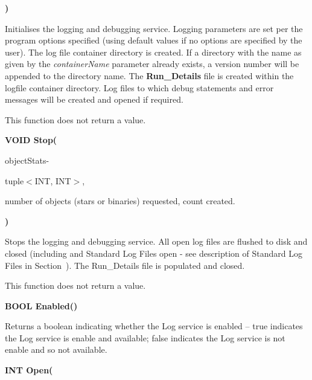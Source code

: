 \textbf{)}

\medskip
Initialises the logging and debugging service. Logging parameters are set per the program options specified (using default values if no options are specified by the user). The log file container directory is created. If a directory with the name as given by the \textit{containerName} parameter already exists, a version number will be appended to the directory name. The \textbf{Run\_Details} file is created within the logfile container directory. Log files to which debug statements and error messages will be created and opened if required.

This function does not return a value.

\newpage
\textbf{VOID Stop(}

\hfill
\begin{minipage}{\dimexpr\textwidth-2em}
    \medskip
    \begin{minipage}[t][][b]{9.5em}objectStats\hfill{-}\end{minipage}
        \begin{minipage}[t][][b]{7.5em}tuple$<$INT, INT$>$,\hfill\end{minipage}
    \begin{minipage}[t][][b]{\dimexpr\textwidth-17.5em}
        number of objects (stars or binaries) requested, count created.
    \end{minipage}\vfill
\end{minipage}

\textbf{)}

\medskip
Stops the logging and debugging service.  All open log files are flushed to disk and closed (including and Standard Log Files open - see description of Standard Log Files in Section~). The Run\_Details file is populated and closed.

This function does not return a value.

\bigskip
\textbf{BOOL Enabled()}

\medskip
Returns a boolean indicating whether the Log service is enabled -- true indicates the Log service is enable and available; false indicates the Log service is not enable and so not available.

\bigskip
\textbf{INT Open(}

